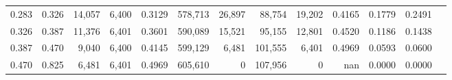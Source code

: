 \begin{tabular}{rrrrrrrrrrrrr}
0.283 & 0.326 &  14,057 & 6,400 &                                     0.3129 & 578,713 &  26,897 &  88,754 &  19,202 & 0.4165 & 0.1779 & 0.2491 \\
0.326 & 0.387 &  11,376 & 6,401 &                                     0.3601 & 590,089 &  15,521 &  95,155 &  12,801 & 0.4520 & 0.1186 & 0.1438 \\
0.387 & 0.470 &   9,040 & 6,400 &                                     0.4145 & 599,129 &   6,481 & 101,555 &   6,401 & 0.4969 & 0.0593 & 0.0600 \\
0.470 & 0.825 &   6,481 & 6,401 &                                     0.4969 & 605,610 &       0 & 107,956 &       0 &    nan & 0.0000 & 0.0000 \\
\bottomrule
\end{tabular}
